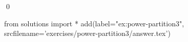 
\begin{ex} 
  \label{ex:power-partition3}
  
  \qed
\end{ex} 
\begin{python0}
from solutions import *
add(label="ex:power-partition3",
    srcfilename='exercises/power-partition3/answer.tex') 
\end{python0}

